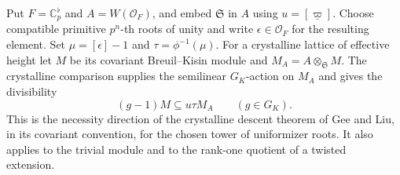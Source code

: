 \documentclass[a4paper,11pt]{article}
\theoremstyle{definition}
\theoremstyle{remark}
\numberwithin{equation}{section}
\begin{document}
Put \(F=\mathbb C_p^\flat\) and \(A=W(\mathcal O_F)\), and
embed \(\mathfrak S\) in \(A\) using \(u=[\underline\varpi]\).
Choose compatible primitive \(p^n\)-th roots of unity and
write \(\epsilon\in\mathcal O_F\) for the resulting element.
Set \(\mu=[\epsilon]-1\) and \(\tau=\phi^{-1}(\mu)\).
For a crystalline lattice of effective height let \(M\) be
its covariant Breuil--Kisin module and \(M_A=A\otimes_{\mathfrak S}M\).
The crystalline comparison supplies the semilinear \(G_K\)-action
on \(M_A\) and gives the divisibility
\[
                 (g-1)M\subseteq u\tau M_A\qquad(g\in G_K).
\]
This is the necessity direction of the crystalline descent
theorem of Gee and Liu, in its covariant convention, for
the chosen tower of uniformizer roots. It also applies to
the trivial module and to the rank-one quotient of a twisted
extension.~\cite[Appendix~F, (F.10) and Theorem~F.11]{III-II-geeliudesc760}
\end{document}
